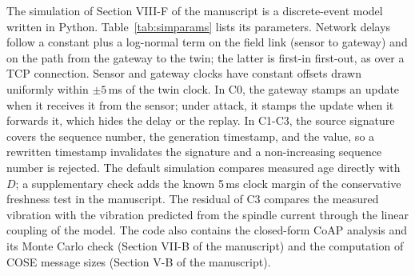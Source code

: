 The simulation of Section VIII-F of the manuscript is a discrete-event model written in Python. Table~\ref{tab:simparams} lists its parameters. Network delays follow a constant plus a log-normal term on the field link (sensor to gateway) and on the path from the gateway to the twin; the latter is first-in first-out, as over a TCP connection. Sensor and gateway clocks have constant offsets drawn uniformly within $\pm 5$\,ms of the twin clock. In C0, the gateway stamps an update when it receives it from the sensor; under attack, it stamps the update when it forwards it, which hides the delay or the replay. In C1-C3, the source signature covers the sequence number, the generation timestamp, and the value, so a rewritten timestamp invalidates the signature and a non-increasing sequence number is rejected. The default simulation compares measured age directly with $D$; a supplementary check adds the known 5\,ms clock margin of the conservative freshness test in the manuscript. The residual of C3 compares the measured vibration with the vibration predicted from the spindle current through the linear coupling of the model. The code also contains the closed-form CoAP analysis and its Monte Carlo check (Section VII-B of the manuscript) and the computation of COSE message sizes (Section V-B of the manuscript).





